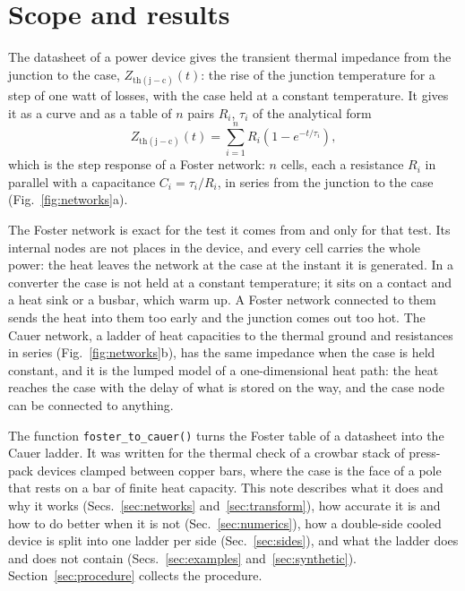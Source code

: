 \documentclass[10pt,a4paper]{scrartcl}
\newcommand{\Zjc}{Z_\mathrm{th(j-c)}}
\newcommand{\code}[1]{\texttt{#1}}
\begin{document}

\tableofcontents
\newpage

\section{Scope and results}
\label{sec:scope}
The datasheet of a power device gives the transient thermal impedance from the junction to the case, $\Zjc(t)$: the rise of the junction temperature for a step of one watt of losses, with the case held at a constant temperature. It gives it as a curve and as a table of $n$ pairs $R_i$, $\tau_i$ of the analytical form
\begin{equation}
\Zjc(t) = \sum_{i=1}^{n} R_i \left(1 - e^{-t/\tau_i}\right) ,
\label{eq:zth}
\end{equation}
which is the step response of a Foster network: $n$ cells, each a resistance $R_i$ in parallel with a capacitance $C_i = \tau_i/R_i$, in series from the junction to the case (Fig.~\ref{fig:networks}a).

The Foster network is exact for the test it comes from and only for that test. Its internal nodes are not places in the device, and every cell carries the whole power: the heat leaves the network at the case at the instant it is generated. In a converter the case is not held at a constant temperature; it sits on a contact and a heat sink or a busbar, which warm up. A Foster network connected to them sends the heat into them too early and the junction comes out too hot. The Cauer network, a ladder of heat capacities to the thermal ground and resistances in series (Fig.~\ref{fig:networks}b), has the same impedance when the case is held constant, and it is the lumped model of a one-dimensional heat path: the heat reaches the case with the delay of what is stored on the way, and the case node can be connected to anything.

The function \code{foster\_to\_cauer()} turns the Foster table of a datasheet into the Cauer ladder. It was written for the thermal check of a crowbar stack of press-pack devices clamped between copper bars, where the case is the face of a pole that rests on a bar of finite heat capacity. This note describes what it does and why it works (Secs.~\ref{sec:networks} and~\ref{sec:transform}), how accurate it is and how to do better when it is not (Sec.~\ref{sec:numerics}), how a double-side cooled device is split into one ladder per side (Sec.~\ref{sec:sides}), and what the ladder does and does not contain (Secs.~\ref{sec:examples} and~\ref{sec:synthetic}). Section~\ref{sec:procedure} collects the procedure.
\end{document}
